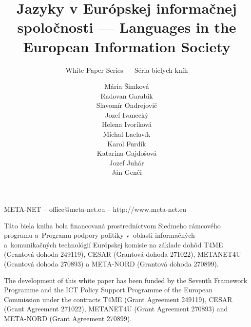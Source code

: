 \documentclass[]{../metanetpaper}
\title{Jazyky v Európskej informačnej spoločnosti --- Languages in the European Information Society}
\subtitle{White Paper Series --- Séria bielych kníh}
\author{%
Mária Šimková \\
Radovan Garabík \\
Slavomír Ondrejovič \\
Jozef Ivanecký \\
Helena Ivoríková \\
Michal Laclavík \\
Karol Furdík \\
Katarína Gajdošová \\
Jozef Juhár \\
Ján Genči \\
}
\begin{document}
\renewcommand*{\figureformat}{\sffamily\thefigure\autodot}

\maketitle



\null
\pagestyle{empty} 

\centerline{META-NET -- office@meta-net.eu -- http://www.meta-net.eu}

\vfill

\begin{small}
  \frenchspacing
  Táto biela kniha bola financovaná prostredníctvom Siedmeho
  rámcového programu a~Programu podpory politiky v~oblasti informačných a~komunikačných technológií
  Európskej komisie na základe dohôd T4ME (Grantová dohoda 249119),
  CESAR (Grantová dohoda 271022), METANET4U (Grantová dohoda 270893)
  a META-NORD (Grantová dohoda 270899).
\end{small}

\bigskip
\begin{small}
  \nonfrenchspacing
  The development of this white paper has been funded by the Seventh
  Framework Programme and the ICT Policy Support Programme of the
  European Commission under the contracts T4ME (Grant Agreement 249119),
  CESAR (Grant Agreement 271022), METANET4U (Grant Agreement 270893)
  and META-NORD (Grant Agreement 270899).
\end{small}

\clearpage

\setcounter{page}{5}
\pagestyle{scrheadings}

\cleardoublepage



\begin{Parallel}[c]{78mm}{78mm}


\ParallelPar
\end{Parallel}
\end{document}

